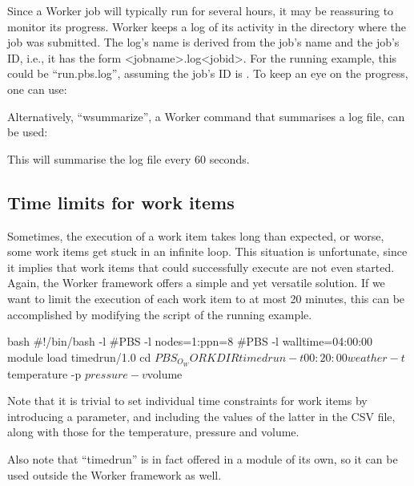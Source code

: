 Since a Worker job will typically run for several hours, it may be reassuring
to monitor its progress. Worker keeps a log of its activity in the directory
where the job was submitted. The log's name is derived from the job's name and
the job's ID, i.e., it has the form <{}jobname>{}.log<{}jobid>{}. For the
running example, this could be ``run.pbs.log\jobnumber'', assuming the job's ID is
\jobnumber. To keep an eye on the progress, one can use:

\begin{prompt}
\end{prompt}

Alternatively, ``wsummarize'', a Worker command that summarises a log file, can be used:

\begin{prompt}
\end{prompt}

This will summarise the log file every 60 seconds.

\subsection{Time limits for work items}

Sometimes, the execution of a work item takes long than expected, or worse,
some work items get stuck in an infinite loop. This situation is unfortunate,
since it implies that work items that could successfully execute are not even
started. Again, the Worker framework offers a simple and yet versatile
solution. If we want to limit the execution of each work item to at most 20
minutes, this can be accomplished by modifying the script of the running
example.

\begin{code}{bash}
#!/bin/bash -l
#PBS -l nodes=1:ppn=8
#PBS -l walltime=04:00:00
module load timedrun/1.0
cd $PBS_O_WORKDIR
timedrun -t 00:20:00 weather -t $temperature  -p $pressure  -v $volume
\end{code}

Note that it is trivial to set individual time constraints for work items by
introducing a parameter, and including the values of the latter in the CSV
file, along with those for the temperature, pressure and volume.

Also note that ``timedrun'' is in fact offered in a module of its own, so it can
be used outside the Worker framework as well.

